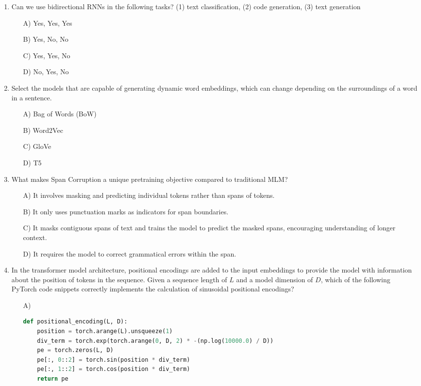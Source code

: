 \documentclass[10pt]{article}
\begin{document}
\begin{enumerate}
    \item Can we use bidirectional RNNs in the following tasks? (1) text classification, (2) code generation, (3) text generation
    \begin{itemize}
        \item[A)] Yes, Yes, Yes 
        \item[B)] Yes, No, No 
        \item[C)] Yes, Yes, No 
        \item[D)] No, Yes, No
    \end{itemize}


    \item Select the models that are capable of generating dynamic word embeddings, which can change depending on the surroundings of a word in a sentence.
    \begin{itemize}
        \item[A)] Bag of Words (BoW)
        \item[B)] Word2Vec 
        \item[C)] GloVe
        \item[D)] T5
    \end{itemize}


    \item What makes Span Corruption a unique pretraining objective compared to traditional MLM?
    \begin{itemize}
        \item[A)] It involves masking and predicting individual tokens rather than spans of tokens.
        \item[B)] It only uses punctuation marks as indicators for span boundaries.
        \item[C)] It masks contiguous spans of text and trains the model to predict the masked spans, encouraging understanding of longer context.
        \item[D)] It requires the model to correct grammatical errors within the span.
    \end{itemize}

    \item In the transformer model architecture, positional encodings are added to the input embeddings to provide the model with information about the position of tokens in the sequence. Given a sequence length of \(L\) and a model dimension of \(D\), which of the following PyTorch code snippets correctly implements the calculation of sinusoidal positional encodings?

    \begin{itemize}
\item[A)] 
\begin{lstlisting}[language=Python]
def positional_encoding(L, D):
    position = torch.arange(L).unsqueeze(1)
    div_term = torch.exp(torch.arange(0, D, 2) * -(np.log(10000.0) / D))
    pe = torch.zeros(L, D)
    pe[:, 0::2] = torch.sin(position * div_term)
    pe[:, 1::2] = torch.cos(position * div_term)
    return pe
\end{lstlisting}


\end{itemize}
\end{enumerate}
\end{document}
